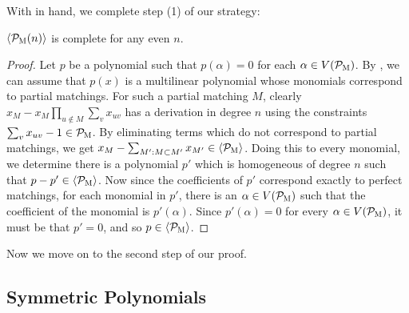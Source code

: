 With  in hand, we complete step (1) of our strategy:
\begin{lemma}\label{lem:matching-complete}
$\langle \mathcal P_{\textsc{M}}(n) \rangle$ is complete for any even $n$. 
\end{lemma}
\begin{proof}
Let $p$ be a polynomial such that $p(\alpha) = 0$ for each $\alpha \in V(\mathcal P_{\textsc{M}})$. By , we can assume that $p(x)$ is a multilinear polynomial whose monomials correspond to partial matchings. For such a partial matching $M$, clearly $x_M - x_M\prod_{u \notin M} \sum_v x_{uv}$ has a derivation in degree $n$ using the constraints $\sum_v x_{uv} - 1 \in \mathcal P_{\textsc{M}}$. By eliminating terms which do not correspond to partial matchings, we get $x_M - \sum_{M': M \subset M'} x_{M'} \in \langle \mathcal P_{\textsc{M}} \rangle$. Doing this to every monomial, we determine there is a polynomial $p'$ which is homogeneous of degree $n$ such that $p - p' \in \langle \mathcal P_{\textsc{M}} \rangle$. Now since the coefficients of $p'$ correspond exactly to perfect matchings, for each monomial in $p'$, there is an $\alpha \in V(\mathcal P_{\textsc{M}})$ such that the coefficient of the monomial is $p'(\alpha)$. Since $p'(\alpha) = 0$ for every $\alpha \in V(\mathcal P_{\textsc{M}})$, it must be that $p' = 0$, and so $p \in \langle \mathcal P_{\textsc{M}} \rangle$.
\end{proof}
Now we move on to the second step of our proof. 

\subsection{Symmetric Polynomials}


